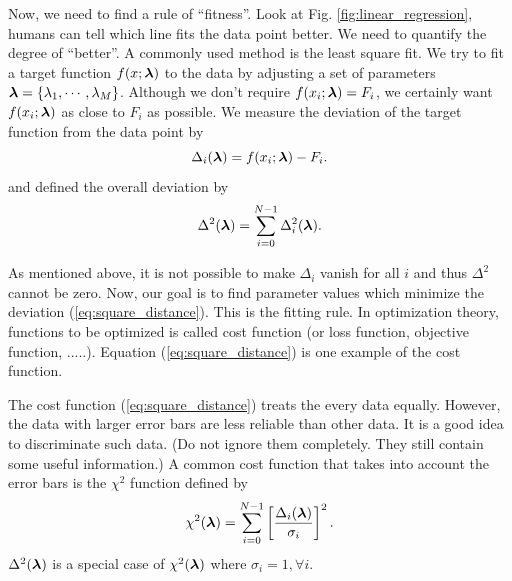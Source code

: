 Now, we need to find a rule of ``fitness''.  Look at Fig. \ref{fig:linear_regression}, humans can tell which line fits the data point better. We need to quantify the degree of ``better''.  A commonly used method is the least square fit.  We try to fit a target function  $f(x;\boldsymbol{\lambda})$ to the data by adjusting a set of parameters $\boldsymbol{\lambda}=\{\lambda_1,\cdots, \lambda_{M}\}$.  Although we don't require $f(x_i;\boldsymbol{\lambda})=F_i$, we certainly want $f(x_i;\boldsymbol{\lambda})$ as close to $F_i$ as possible.   We measure the deviation of the target function from the data point by
\begin{equation}\label{eq:fitting_deviation}
\Delta_i(\boldsymbol{\lambda}) = f(x_i;\boldsymbol{\lambda})-F_i.
\end{equation}
and defined the overall deviation by 
\begin{equation}\label{eq:square_distance}
\Delta^2 (\boldsymbol{\lambda}) = \sum_{i=0}^{N-1} \Delta_i^2(\boldsymbol{\lambda}).
\end{equation}
 
As mentioned above, it is not possible to make $\Delta_i$ vanish for all $i$ and thus $\Delta^2$ cannot be zero.  Now, our goal is to find parameter values which minimize the deviation (\ref{eq:square_distance}).  This is the fitting rule.  In optimization theory, functions to be optimized is called cost function (or loss function, objective function, .....).  Equation (\ref{eq:square_distance}) is one example of the cost function.

The cost function (\ref{eq:square_distance}) treats the every data equally. However, the data with larger error bars are less reliable than other data.  It is a good idea to discriminate such data. (Do not ignore them completely. They still contain some useful information.)  A common cost function that takes into account the error bars is the $\chi^2$ function defined by 
\begin{equation}\label{eq:chi2_function}
\chi^2(\boldsymbol{\lambda}) = \sum_{i=0}^{N-1} \left [\frac{\Delta_i(\boldsymbol{\lambda})}{\sigma_i} \right ]^2.
\end{equation}
$\Delta^2(\boldsymbol{\lambda})$ is a special case of $\chi^2(\boldsymbol{\lambda})$ where $\sigma_i=1, \forall i$.

